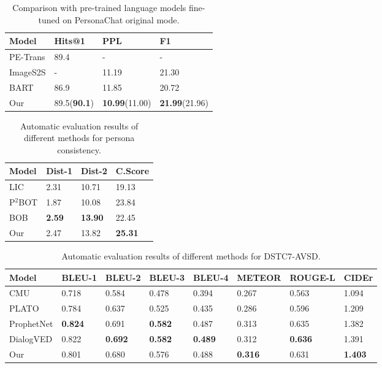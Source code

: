 \documentclass[letterpaper]{article} \usepackage{aaai23}  \usepackage{times}  \usepackage{helvet}  \usepackage{courier}  \usepackage[hyphens]{url}  \usepackage{graphicx} \urlstyle{rm} \def\UrlFont{\rm}  \usepackage{natbib}  \usepackage{caption} \frenchspacing  \setlength{\pdfpagewidth}{8.5in}  \setlength{\pdfpageheight}{11in}  \usepackage{algorithm}
\begin{document}
\begin{table}[t]
  \centering
    \begin{tabular}{llll}
    \toprule
    Model & Hits@1 & PPL   & F1 \\
    \midrule
    PE-Trans & \multicolumn{1}{l}{89.4} & \multicolumn{1}{l}{-} & \multicolumn{1}{l}{-} \\
ImageS2S & \multicolumn{1}{l}{-} & \multicolumn{1}{l}{11.19} & \multicolumn{1}{l}{21.30} \\
BART  & \multicolumn{1}{l}{86.9} & \multicolumn{1}{l}{11.85} & \multicolumn{1}{l}{20.72} \\
Our   & 89.5(\textbf{90.1}) & \textbf{10.99}(11.00) & \textbf{21.99}(21.96) \\
    \bottomrule
    \end{tabular}\caption{Comparison with pre-trained language models fine-tuned on PersonaChat original mode.}
\label{table2}\end{table}\begin{table}[t]
  \centering
    \begin{tabular}{llll}
    \toprule
    Model & \multicolumn{1}{p{4.19em}}{Dist-1} & \multicolumn{1}{p{4.19em}}{Dist-2} & \multicolumn{1}{p{4.19em}}{C.Score} \\
    \midrule
    LIC   & 2.31  & 10.71 & 19.13 \\
P$^2$BOT & 1.87   & 10.08   &  23.84\\
BOB   & \textbf{2.59}      & \textbf{13.90}   &  22.45\\
Our   & 2.47  & 13.82 &  \textbf{25.31}\\
    \bottomrule
    \end{tabular}
\caption{Automatic evaluation results of different methods for persona consistency.}
\label{table3}
\end{table}
\begin{table*}[t]
  \centering
    \begin{tabular}{llllllll}
    \toprule
    Model & \multicolumn{1}{p{4.19em}}{BLEU-1} & \multicolumn{1}{p{4.19em}}{BLEU-2} & \multicolumn{1}{p{4.19em}}{BLEU-3} & \multicolumn{1}{p{4.19em}}{BLEU-4} & \multicolumn{1}{p{4.19em}}{METEOR} & \multicolumn{1}{p{4.49em}}{ROUGE-L} & \multicolumn{1}{p{4.19em}}{CIDEr} \\
    \midrule
    CMU   & 0.718 & 0.584 & 0.478 & 0.394 & 0.267 & 0.563 & 1.094 \\
PLATO & 0.784 & 0.637 & 0.525 & 0.435 & 0.286 & 0.596 & 1.209 \\
ProphetNet & \textbf{0.824} & 0.691 & \textbf{0.582} & 0.487 & 0.313 & 0.635 & 1.382 \\
DialogVED & 0.822 & \textbf{0.692} & \textbf{0.582} & \textbf{0.489} & 0.312 & \textbf{0.636} & 1.391 \\
Our   & 0.801 & 0.680  & 0.576 & 0.488 & \textbf{0.316} & 0.631 & \textbf{1.403} \\
    \bottomrule
    \end{tabular}
\caption{Automatic evaluation results of different methods for DSTC7-AVSD.}
\label{table4}
\end{table*}
\end{document}

